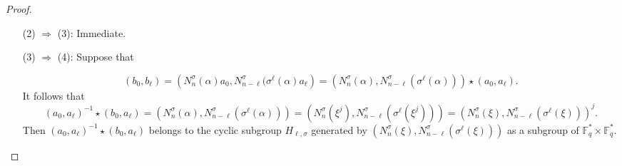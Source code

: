 \documentclass[12pt,paper]{article}
\theoremstyle{plain}
\newcommand{\Fq}{\mathbb{F}_{q}}
\begin{document}
\begin{proof}
\begin{itemize}
 \item[(2) $\Rightarrow$ (3):] Immediate.
 \item[(3) $\Rightarrow$ (4):] Suppose that

$$  (b_0, b_{\ell} )= \left( N_{n}^{\sigma}(\alpha) a_0, N_{n-\ell}^{\sigma}(\sigma^{\ell}(\alpha) a_{\ell}\right)=\left(N_{n}^{\sigma}(\alpha), N_{n-\ell}^{\sigma}(\sigma^{\ell}(\alpha))\right)\star (a_0, a_{\ell}).$$ 
It follows that
$$  (a_0,a_{\ell})^{-1}\star (b_0, a_{\ell})=  \left( N_{n}^{\sigma}(\alpha), N_{n-\ell}^{\sigma}( \sigma^{\ell}(\alpha)) \right)= \left( N_{n}^{\sigma}(\xi^j),
N_{n-\ell}^{\sigma}(\sigma^{\ell}(\xi^j))\right)= 
\left(N_{n}^{\sigma}(\xi), N_{n-\ell}^{\sigma}(\sigma^{\ell}(\xi))\right)^j .$$
Then $ (a_0,a_{\ell})^{-1}\star (b_0, a_{\ell}) $ belongs to the cyclic subgroup  $H_{\ell,\sigma}$ generated by $  \left(N_{n}^{\sigma}(\xi), N_{n-\ell}^{\sigma}(\sigma^{\ell}(\xi))\right) $  as a subgroup of $ \Fq^{*}\times \Fq^{*}.$


\end{itemize}
\end{proof}
\end{document}
